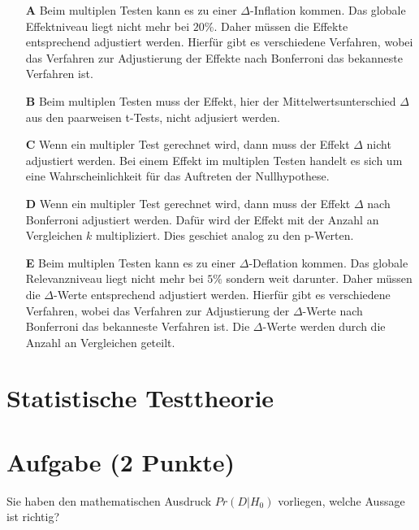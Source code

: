 \documentclass[a4paper, 9pt]{scrartcl}\usepackage[]{graphicx}\usepackage[]{xcolor}
\begin{document}
\begin{enumerate}
\item [\textbf{A} \msquare] Beim multiplen Testen kann es zu einer $\Delta$-Inflation kommen. Das globale Effektniveau liegt nicht mehr bei $20\%$. Daher müssen die Effekte entsprechend adjustiert werden. Hierfür gibt es verschiedene Verfahren, wobei das Verfahren zur Adjustierung der Effekte nach Bonferroni das bekanneste Verfahren ist.
\item [\textbf{B} \msquare] Beim multiplen Testen muss der Effekt, hier der Mittelwertsunterschied $\Delta$ aus den paarweisen t-Tests, nicht adjusiert werden.
\item [\textbf{C} \msquare] Wenn ein multipler Test gerechnet wird, dann muss der Effekt $\Delta$ nicht adjustiert werden. Bei einem Effekt im multiplen Testen handelt es sich um eine Wahrscheinlichkeit für das Auftreten der Nullhypothese.
\item [\textbf{D} \msquare] Wenn ein multipler Test gerechnet wird, dann muss der Effekt $\Delta$ nach Bonferroni adjustiert werden. Dafür wird der Effekt mit der Anzahl an Vergleichen $k$ multipliziert. Dies geschiet analog zu den p-Werten.
\item [\textbf{E} \msquare] Beim multiplen Testen kann es zu einer $\Delta$-Deflation kommen. Das globale Relevanzniveau liegt nicht mehr bei $5\%$ sondern weit darunter. Daher müssen die $\Delta$-Werte entsprechend adjustiert werden. Hierfür gibt es verschiedene Verfahren, wobei das Verfahren zur Adjustierung der $\Delta$-Werte nach Bonferroni das bekanneste Verfahren ist. Die $\Delta$-Werte werden durch die Anzahl an Vergleichen geteilt.
\end{enumerate}
\section*{Statistische Testtheorie}  

\section{Aufgabe \hfill (2 Punkte)}




Sie haben den mathematischen Ausdruck $Pr(D|H_0)$ vorliegen, welche Aussage ist richtig?
\end{document}
